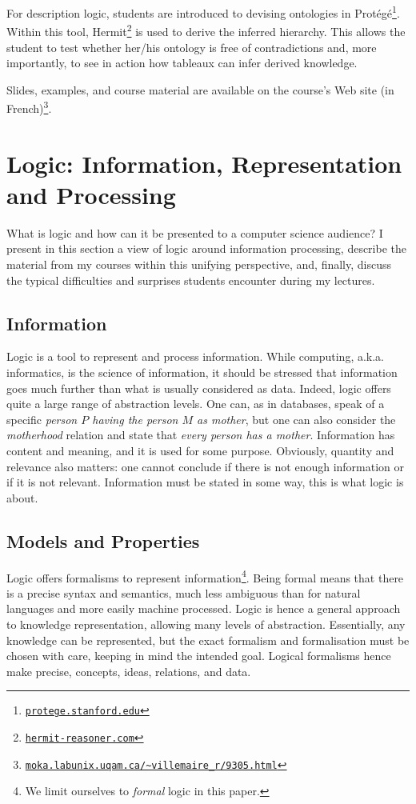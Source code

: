 \documentclass[a4paper,UKenglish]{lipics}
\begin{document}
For description logic, students are introduced to devising ontologies in Prot\'eg\'e\footnote{\href{http://protege.stanford.edu}{\nolinkurl{protege.stanford.edu}}}. Within this tool, Hermit\footnote{\href{http://hermit-reasoner.com}{\nolinkurl{hermit-reasoner.com}}} is used to derive the inferred hierarchy. This allows the student to test whether her/his ontology is free of contradictions and, more importantly, to see in action how tableaux can infer derived knowledge.

Slides, examples, and course material are available on the course's Web site (in French)\footnote{\href{http://moka.labunix.uqam.ca/~villemaire_r/9305.html}{\nolinkurl{moka.labunix.uqam.ca/~villemaire_r/9305.html}}}.
\section{Logic: Information, Representation and Processing}\label{SECLOG} What is logic and how can it be presented to a computer science audience? I present in this section a view of logic around information processing, describe the material from my courses within this unifying perspective, and, finally, discuss the typical difficulties and surprises students encounter during my lectures.
\subsection{Information} Logic is a tool to represent and process information. While computing, a.k.a. informatics, is the science of information, it should be stressed that information goes much further than what is usually considered as data. Indeed, logic offers quite a large range of abstraction levels. One can, as in databases, speak of a specific \emph{person $P$ having the person $M$ as mother}, but one can also consider the \emph{motherhood} relation and state that \emph{every person has a mother}. Information has content and meaning, and it is used for some purpose. Obviously, quantity and relevance also matters: one cannot conclude if there is not enough information or if it is not relevant. Information must be stated in some way, this is what logic is about.
\subsection{Models and Properties}
Logic offers formalisms to represent information\footnote{We limit ourselves to \emph{formal} logic in this paper.}. Being formal means that there is a precise syntax and semantics, much less ambiguous than for natural languages and more easily machine processed. Logic is hence a general approach to knowledge representation, allowing many levels of abstraction. Essentially, any knowledge can be represented, but the exact formalism and formalisation must be chosen with care, keeping in mind the intended goal. Logical formalisms hence make precise, concepts, ideas, relations, and data.
\end{document}
